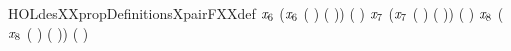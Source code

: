 \begin{SaveVerbatim}{HOLdesXXpropDefinitionsXpairFXXdef}
       \ensuremath{\HOLBoundVar{x}\sb{\mathrm{6}}} \HOLSymConst{\HOLTokenEor{}}  (\ensuremath{\HOLBoundVar{x}\sb{\mathrm{6}}} \HOLSymConst{\HOLTokenEor{}} ( \HOLSymConst{\HOLTokenExtract{}} ) ( )) \HOLSymConst{=} ( \HOLSymConst{\HOLTokenExtract{}} )  \HOLSymConst{\HOLTokenConj{}}
       \ensuremath{\HOLBoundVar{x}\sb{\mathrm{7}}} \HOLSymConst{\HOLTokenEor{}}  (\ensuremath{\HOLBoundVar{x}\sb{\mathrm{7}}} \HOLSymConst{\HOLTokenEor{}} ( \HOLSymConst{\HOLTokenExtract{}} ) ( )) \HOLSymConst{=} ( \HOLSymConst{\HOLTokenExtract{}} )  \HOLSymConst{\HOLTokenConj{}}
       \ensuremath{\HOLBoundVar{x}\sb{\mathrm{8}}} \HOLSymConst{\HOLTokenEor{}}  (\ensuremath{\HOLBoundVar{x}\sb{\mathrm{8}}} \HOLSymConst{\HOLTokenEor{}} ( \HOLSymConst{\HOLTokenExtract{}} ) ( )) \HOLSymConst{=} ( \HOLSymConst{\HOLTokenExtract{}} ) \HOLTokenRightbrace{}
\end{SaveVerbatim}
\newcommand{\HOLdesXXpropDefinitionsXpairFXXdef}{\UseVerbatim{HOLdesXXpropDefinitionsXpairFXXdef}}
